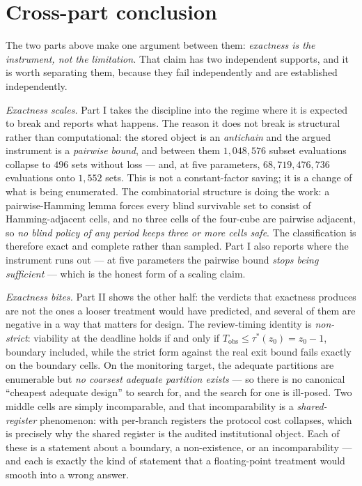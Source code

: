 \documentclass[10pt,twocolumn]{article}
\theoremstyle{plain}
\theoremstyle{definition}
\theoremstyle{remark}
\begin{document}
\section{Cross-part conclusion}
\label{conclusion}

The two parts above make one argument between them: \emph{exactness is the instrument, not the
limitation.} That claim has two independent supports, and it is worth separating them, because they
fail independently and are established independently.

\emph{Exactness scales.} Part I takes the discipline into the regime where it is expected to break
and reports what happens. The reason it does not break is structural rather than computational: the
stored object is an \emph{antichain} and the argued instrument is a \emph{pairwise bound}, and
between them $1{,}048{,}576$ subset evaluations collapse to $496$ sets without loss --- and, at five
parameters, $68{,}719{,}476{,}736$ evaluations onto $1{,}552$ sets. This is not a constant-factor
saving; it is a change of what is being enumerated. The combinatorial structure is doing the work:
a pairwise-Hamming lemma forces every blind survivable set to consist of Hamming-adjacent cells,
and no three cells of the four-cube are pairwise adjacent, so \emph{no blind policy of any period
keeps three or more cells safe}. The classification is therefore exact and complete rather than
sampled. Part I also reports where the instrument runs out --- at five parameters the pairwise bound
\emph{stops being sufficient} --- which is the honest form of a scaling claim.

\emph{Exactness bites.} Part II shows the other half: the verdicts that exactness produces are not
the ones a looser treatment would have predicted, and several of them are negative in a way that
matters for design. The review-timing identity is \emph{non-strict}: viability at the deadline holds
if and only if $T_{\mathrm{obs}} \le \tau^{*}(z_0) = z_0 - 1$, boundary included, while the strict
form against the real exit bound fails exactly on the boundary cells. On the monitoring target, the
adequate partitions are enumerable but \emph{no coarsest adequate partition exists} --- so there is
no canonical ``cheapest adequate design'' to search for, and the search for one is ill-posed. Two
middle cells are simply incomparable, and that incomparability is a \emph{shared-register}
phenomenon: with per-branch registers the protocol cost collapses, which is precisely why the shared
register is the audited institutional object. Each of these is a statement about a boundary, a
non-existence, or an incomparability --- and each is exactly the kind of statement that a
floating-point treatment would smooth into a wrong answer.
\end{document}
